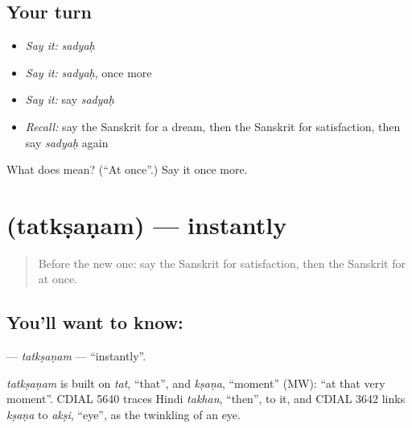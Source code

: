\subsection*{Your turn}
\begin{itemize}
\raggedright
  \item \emph{Say it:} \emph{sadyaḥ}
  \item \emph{Say it:} \emph{sadyaḥ}, once more
  \item \emph{Say it:} say \emph{sadyaḥ}
  \item \emph{Recall:} say the Sanskrit for a dream, then the Sanskrit for satisfaction, then say \emph{sadyaḥ} again
\end{itemize}

\begin{tcolorbox}[breakable,colback=teal!4,colframe=teal!35!black,title={Before you move on}]
What does  mean? (\textquotedblleft{}At once\textquotedblright{}.) Say it once more.
\end{tcolorbox}
\section[\texorpdfstring{\sk{तत्क्षणम्} (tatkṣaṇam)}{तत्क्षणम् (tatkṣaṇam)}]{ (tatkṣaṇam) — instantly}

\label{lesson:SA-C213-tatksanam}



\begin{quote}
Before the new one: say the Sanskrit for satisfaction, then the Sanskrit for at once.
\end{quote}

\subsection*{You'll want to know: }
\textbf{} — \emph{tatkṣaṇam} — \textquotedblleft{}instantly\textquotedblright{}.

\begin{cousinweb}
\emph{tatkṣaṇam} is built on \emph{tat}, \textquotedblleft{}that\textquotedblright{}, and \emph{kṣaṇa}, \textquotedblleft{}moment\textquotedblright{} (MW): \textquotedblleft{}at that very moment\textquotedblright{}. CDIAL 5640 traces Hindi \emph{takhan}, \textquotedblleft{}then\textquotedblright{}, to it, and CDIAL 3642 links \emph{kṣaṇa} to \emph{akṣi}, \textquotedblleft{}eye\textquotedblright{}, as the twinkling of an eye.
\end{cousinweb}

